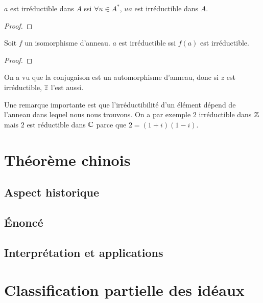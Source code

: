 \begin{proposition}
	$a$ est irréductible dans $A$ ssi $\forall u \in A^{*}$, $ua$ est
	irréductible dans $A$.
\end{proposition}

\begin{proof}
	
\end{proof}

\begin{proposition}
	Soit $f$ un isomorphisme d'anneau. $a$ est irréductible ssi $f(a)$ est
	irréductible.
\end{proposition}

\begin{proof}
	
\end{proof}

\begin{exemple}
	On a vu que la conjugaison est un automorphisme d'anneau, donc si $z$ est
	irréductible, $\overline{z}$ l'est aussi.
\end{exemple}

Une remarque importante est que l'irréductibilité d'un élément dépend de l'anneau
dans lequel nous nous trouvons. On a par exemple $2$ irréductible dans
$\mathbb{Z}$ mais $2$ est réductible dans $\mathbb{C}$ parce que $2 = (1 + i) (1 -
i)$.



\section{Théorème chinois}

\subsection{Aspect historique}

\subsection{Énoncé}

\subsection{Interprétation et applications}


\section{Classification partielle des idéaux}

